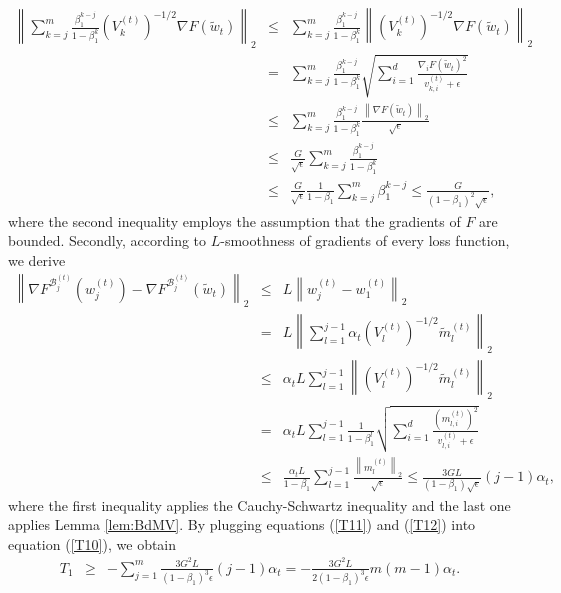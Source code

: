\documentclass[twoside]{article}
\def\BB{\mathcal{B}}
\begin{document}
\begin{eqnarray}
\label{T11}
\left\| \sum_{k=j}^{m} \frac{\beta_1^{k-j}}{1-\beta_1^k} \left(V_k^{(t)}\right)^{-1/2}\nabla F(\widetilde w_t)\right\|_2&\leq& \sum_{k=j}^{m} \frac{\beta_1^{k-j}}{1-\beta_1^k}\left\| \left(V_k^{(t)}\right)^{-1/2}\nabla F(\widetilde w_t)\right\|_2\nonumber\\
&=&\sum_{k=j}^{m} \frac{\beta_1^{k-j}}{1-\beta_1^k}\sqrt{\sum_{i=1}^d \frac{\nabla_i F(\widetilde w_t)^2 }{v_{k,i}^{(t)} +\epsilon}} \nonumber\\
&\leq& \sum_{k=j}^{m} \frac{\beta_1^{k-j}}{1-\beta_1^k} \frac{\left\|\nabla F(\widetilde w_t)\right\|_2}{\sqrt{\epsilon}}\nonumber\\
&\leq& \frac{G}{\sqrt{\epsilon}}\sum_{k=j}^{m}\frac{\beta_1^{k-j}}{1-\beta_1^k} \nonumber\\
&\leq& \frac{G}{\sqrt{\epsilon}} \frac{1}{1-\beta_1}\sum_{k=j}^{m} \beta_1^{k-j}\leq \frac{G}{(1-\beta_1)^2\sqrt{\epsilon}} ,
\end{eqnarray}
where the second inequality employs the assumption that the gradients of $F$ are bounded. Secondly, according to $L$-smoothness of gradients of every loss function, we derive
\begin{eqnarray}
\label{T12}
\left\|\nabla F^{\BB^{(t)}_j}\left(w_j^{(t)}\right) - \nabla F^{\BB^{(t)}_j}\left(\widetilde w_t\right)\right\|_2 &\leq& L\left\|w_{j}^{(t)} - w_1^{(t)}\right\|_2 \nonumber\\
&=& L \left\| \sum_{l=1}^{j-1} \alpha_t \left(V_l^{(t)}\right)^{-1/2} \widetilde m_l^{(t)}\right\|_2\nonumber\\
&\leq& \alpha_t L \sum_{l=1}^{j-1} \left\| \left(V_l^{(t)}\right)^{-1/2} \widetilde m_l^{(t)}\right\|_2 \nonumber\\
&=& \alpha_t L \sum_{l=1}^{j-1} \frac{1}{1-\beta_1^l} \sqrt{\sum_{i=1}^d \frac{\left(m_{l,i}^{(t)}\right)^{2}}{v_{l,i}^{(t)}+\epsilon }}\nonumber\\
&\leq& \frac{\alpha_t L}{1-\beta_1}\sum_{l=1}^{j-1} \frac{\left\|m_l^{(t)}\right\|_2}{\sqrt{\epsilon}}\leq \frac{3GL}{(1-\beta_1)\sqrt{\epsilon}} (j-1) \alpha_t ,
\end{eqnarray}
where the first inequality applies the Cauchy-Schwartz inequality and the last one applies Lemma \ref{lem:BdMV}. By plugging equations (\ref{T11}) and (\ref{T12}) into equation (\ref{T10}), we obtain
\begin{eqnarray}
\label{T1}
T_1 &\geq& - \sum_{j=1}^{m} \frac{3G^2L}{(1-\beta_1)^3\epsilon} (j-1) \alpha_t =- \frac{3G^2L}{2(1-\beta_1)^3\epsilon} m(m-1) \alpha_t.
\end{eqnarray}
\end{document}
